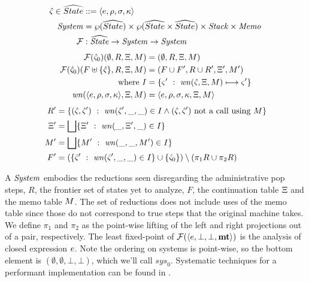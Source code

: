 {
\setlength{\abovedisplayskip}{0pt}
\setlength{\belowdisplayskip}{4pt}
\setlength{\abovedisplayshortskip}{0pt}
\setlength{\belowdisplayshortskip}{8pt}
\begin{align*}
  \hat\varsigma \in \widehat{State} &::= \langle e,\rho,\sigma,\kappa \rangle \\
  \mathit{System} &= \wp(\widehat{State}) \times \wp(\widehat{State} \times \widehat{State}) \times \mathit{Stack} \times \mathit{Memo} \\
  {\mathcal F} &: \widehat{\mathit{State}} \to \mathit{System} \to \mathit{System}
\end{align*}
\begin{align*}
  {\mathcal F}(\hat\varsigma_0)(\emptyset, R, \Xi, M) &= (\emptyset, R, \Xi, M) \\
  {\mathcal F}(\hat\varsigma_0)(F\uplus\{ \hat\varsigma \}, R, \Xi, M) &= (F\cup F', R \cup R', \Xi', M') \\
  \text{where } I &= \{ \varsigma'\ :\ \mathit{wn}(\hat\varsigma,\Xi,M) \longmapsto \varsigma'\} \\
                \mathit{wn}(\langle e,\rho,\sigma,\kappa \rangle,\Xi,M)
                   &= \langle e,\rho,\sigma,\kappa,\Xi,M \rangle
\end{align*}
\begin{align*}
    R' &= \{ (\hat\varsigma,\hat\varsigma')\ :\ \mathit{wn}(\hat\varsigma', \_, \_) \in I \wedge (\hat\varsigma,\hat\varsigma') \text{ not a call using } M\} \\
    \Xi' &=  \bigsqcup\{ \Xi'\ :\ \mathit{wn}(\_, \Xi', \_) \in I\} \\
    M' &= \bigsqcup\{ M'\ :\ \mathit{wn}(\_, \_, M') \in I\} \\
    F' &= (\{ \hat\varsigma'\ :\ \mathit{wn}(\hat\varsigma', \_, \_) \in I\} \cup \{ \hat\varsigma_0 \})\setminus (\pi_1 R \cup \pi_2 R)
  \end{align*}
}

A $\mathit{System}$ embodies the reductions seen disregarding the administrative pop steps, $R$, the frontier set of states yet to analyze, $F$, the continuation table $\Xi$ and the memo table $M$.
%
The set of reductions does not include uses of the memo table since those do not correspond to true steps that the original machine takes.
%
We define $\pi_1$ and $\pi_2$ as the point-wise lifting of the left and right projections out of a pair, respectively.
%
The least fixed-point of ${\mathcal F}(\langle e,\bot,\bot,\mathbf{mt} \rangle)$ is the analysis of closed expression $e$.
%
Note the ordering on systems is point-wise, so the bottom element is $(\emptyset,\emptyset,\bot,\bot)$, which we'll call $\mathit{sys}_0$.
%
Systematic techniques for a performant implementation can be found in \citet{ianjohnson:oaam:icfp2013}.
%

